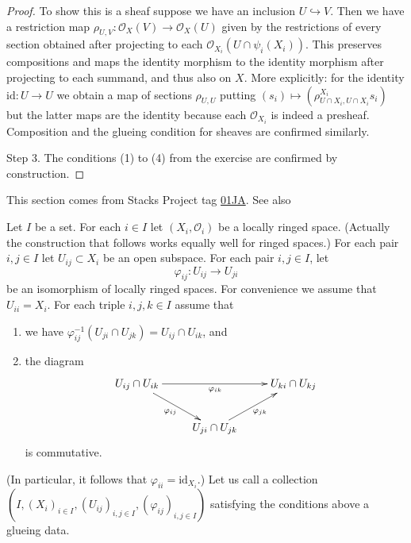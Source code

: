 \begin{proof}
To show this is a sheaf suppose we have
an inclusion $U \hookrightarrow V$.
Then we have a restriction map
$\rho_{U,V}:\mathcal{O}_X(V)
\to \mathcal{O}_X(U)$
given by the restrictions of
every section obtained after projecting
to each $\mathcal{O}_{X_i}(U 
\cap \psi_i(X_i))$.
This preserves compositions
and maps the identity
morphism to the identity morphism
after projecting to each summand,
and thus also on $X$.
More explicitly: for the identity
$\text{id}:U \to U$ we obtain a map
of sections $\rho_{U,U}$ putting
$(s_i) \mapsto (\rho^{X_i}_{U \cap X_i,
U\cap X_i}s_i)$
but the latter maps are the identity
because each $\mathcal{O}_{X_i}$ is indeed
a presheaf. Composition and the 
glueing condition for sheaves are
confirmed similarly.

Step 3. The conditions (1) to (4)
from the exercise are confirmed by
construction.
\end{proof}

\noindent
This section comes from Stacks Project
tag 
\href{https://stacks.math.columbia.edu/tag/01JA}{01JA}. See also

Let $I$ be a set.
For each $i \in I$ let $(X_i, \mathcal{O}_i)$ be
a locally ringed space. (Actually the construction that
follows works equally well for ringed spaces.)
For each pair $i, j \in I$ let $U_{ij} \subset X_i$
be an open subspace.
For each pair $i, j \in I$, let
$$
\varphi_{ij} : U_{ij} \to U_{ji}
$$
be an isomorphism of locally ringed spaces.
For convenience we assume that $U_{ii} = X_i$.
For each triple $i, j, k \in I$ assume that
\begin{enumerate}
\item we have
$\varphi_{ij}^{-1}(U_{ji} \cap U_{jk}) =  U_{ij} \cap U_{ik}$, and
\item the diagram
$$
\xymatrix{
U_{ij} \cap U_{ik} \ar[rr]_{\varphi_{ik}} \ar[rd]_{\varphi_{ij}} & &
U_{ki} \cap U_{kj} \\
& U_{ji} \cap U_{jk} \ar[ru]_{\varphi_{jk}}
}
$$
is commutative.
\end{enumerate}
(In particular, it follows that $\varphi_{ii} = \text{id}_{X_i}$.)
Let us call a collection
$(I, (X_i)_{i\in I}, (U_{ij})_{i, j\in I}, (\varphi_{ij})_{i, j\in I})$
satisfying the conditions above a glueing data.

